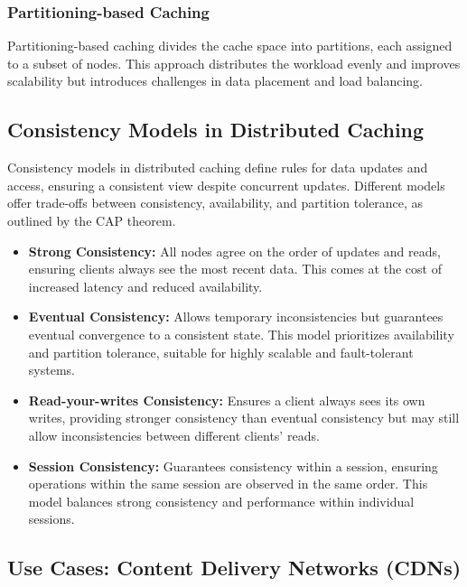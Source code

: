 \documentclass[12pt]{book} %
\begin{document}
\subsubsection{Partitioning-based Caching}

Partitioning-based caching divides the cache space into partitions, each assigned to a subset of nodes. This approach distributes the workload evenly and improves scalability but introduces challenges in data placement and load balancing.

\subsection{Consistency Models in Distributed Caching}

Consistency models in distributed caching define rules for data updates and access, ensuring a consistent view despite concurrent updates. Different models offer trade-offs between consistency, availability, and partition tolerance, as outlined by the CAP theorem.

\begin{itemize}
    \item \textbf{Strong Consistency:} All nodes agree on the order of updates and reads, ensuring clients always see the most recent data. This comes at the cost of increased latency and reduced availability.
    
    \item \textbf{Eventual Consistency:} Allows temporary inconsistencies but guarantees eventual convergence to a consistent state. This model prioritizes availability and partition tolerance, suitable for highly scalable and fault-tolerant systems.
    
    \item \textbf{Read-your-writes Consistency:} Ensures a client always sees its own writes, providing stronger consistency than eventual consistency but may still allow inconsistencies between different clients' reads.
    
    \item \textbf{Session Consistency:} Guarantees consistency within a session, ensuring operations within the same session are observed in the same order. This model balances strong consistency and performance within individual sessions.
\end{itemize}

\subsection{Use Cases: Content Delivery Networks (CDNs)}
\end{document}

